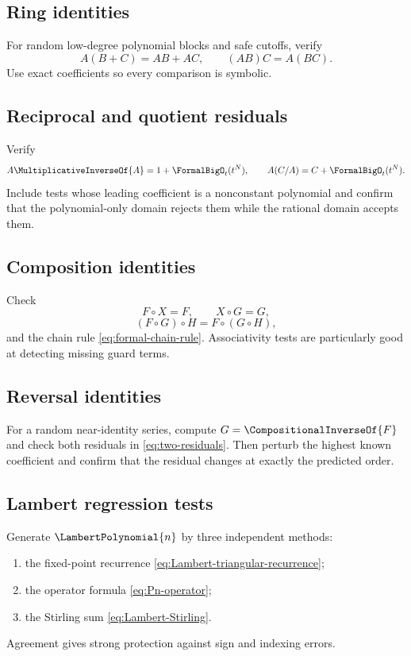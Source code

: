 \documentclass[11pt,openany]{book}
\theoremstyle{definition}
\theoremstyle{plain}
\theoremstyle{remark}
\newcommand{\rev}[1]{\CompositionalInverseOf{#1}}
\newcommand{\recip}[1]{\MultiplicativeInverseOf{#1}}
\newcommand{\compose}{\mathbin{\circ}}
\begin{document}
\subsection{Ring identities}
For random low-degree polynomial blocks and safe cutoffs, verify
\[
 A(B+C)=AB+AC,
 \qquad
 (AB)C=A(BC).
\]
Use exact coefficients so every comparison is symbolic.

\subsection{Reciprocal and quotient residuals}
Verify
\[
 A\recip{A}=1+\FormalBigO_t(t^N),
 \qquad
 A(C/A)=C+\FormalBigO_t(t^N).
\]
Include tests whose leading coefficient is a nonconstant polynomial and confirm
that the polynomial-only domain rejects them while the rational domain accepts
them.

\subsection{Composition identities}
Check
\[
 F\compose X=F,
 \qquad
 X\compose G=G,
\]
\[
 (F\compose G)\compose H=F\compose(G\compose H),
\]
and the chain rule \cref{eq:formal-chain-rule}.  Associativity tests are
particularly good at detecting missing guard terms.

\subsection{Reversal identities}
For a random near-identity series, compute \(G=\rev F\) and check both residuals
in \cref{eq:two-residuals}.  Then perturb the highest known coefficient and
confirm that the residual changes at exactly the predicted order.

\subsection{Lambert regression tests}
Generate \(\LambertPolynomial{n}\) by three independent methods:
\begin{enumerate}
\item the fixed-point recurrence \cref{eq:Lambert-triangular-recurrence};
\item the operator formula \cref{eq:Pn-operator};
\item the Stirling sum \cref{eq:Lambert-Stirling}.
\end{enumerate}
Agreement gives strong protection against sign and indexing errors.
\end{document}
